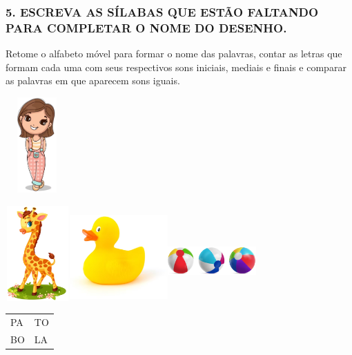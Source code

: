 \subsubsection{5. ESCREVA AS SÍLABAS QUE ESTÃO FALTANDO PARA COMPLETAR O
NOME DO
DESENHO.}\label{escreva-as-suxedlabas-que-estuxe1-faltando-para-completar-o-nome-do-desenho.}

Retome o alfabeto móvel para formar o nome das palavras, contar as
letras que formam cada uma com seus respectivos sons iniciais, mediais e finais e comparar as palavras em que aparecem sons iguais.

\includegraphics[width=0.94792in,height=1.44104in]{media/image17.png}

\includegraphics[width=0.97153in,height=1.43750in]{media/image18.png}\includegraphics[width=1.48140in,height=1.32986in]{media/image19.png}\includegraphics[width=1.32769in,height=1.21097in]{media/image20.png}

\begin{longtable}[]{@{}ll@{}}
\toprule
PA & TO\tabularnewline
BO & LA\tabularnewline
\bottomrule
\end{longtable}

